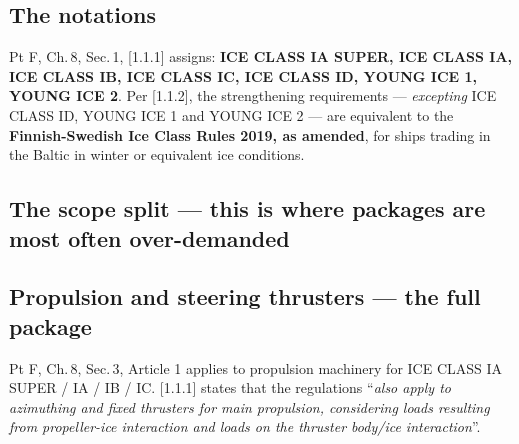 \documentclass[11pt,a4paper]{report}
\begin{document}
\subsection{The notations}
Pt F, Ch.\,8, Sec.\,1, [1.1.1] assigns: \textbf{ICE CLASS IA SUPER, ICE CLASS
IA, ICE CLASS IB, ICE CLASS IC, ICE CLASS ID, YOUNG ICE 1, YOUNG ICE 2}. Per
[1.1.2], the strengthening requirements --- \emph{excepting} ICE CLASS ID,
YOUNG ICE 1 and YOUNG ICE 2 --- are equivalent to the \textbf{Finnish-Swedish
Ice Class Rules 2019, as amended}, for ships trading in the Baltic in winter or
equivalent ice conditions.

\subsection{The scope split --- this is where packages are most often over-demanded}

\vspace{1mm}
\noindent{}

\subsection{Propulsion and steering thrusters --- the full package}
Pt F, Ch.\,8, Sec.\,3, Article 1 applies to propulsion machinery for ICE CLASS
IA SUPER / IA / IB / IC. [1.1.1] states that the regulations ``\emph{also apply
to azimuthing and fixed thrusters for main propulsion, considering loads
resulting from propeller-ice interaction and loads on the thruster body/ice
interaction}''.
\end{document}
